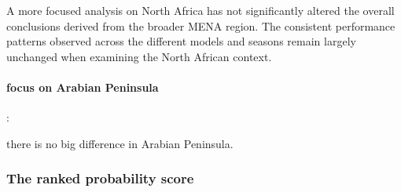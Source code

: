 A more focused analysis on North Africa has not significantly altered the overall conclusions derived from the broader MENA region. The consistent performance patterns observed across the different models and seasons remain largely unchanged when examining the North African context. 

\paragraph{focus on Arabian Peninsula}:

there is no big difference in  Arabian Peninsula.

\subsubsection{The ranked probability score}

